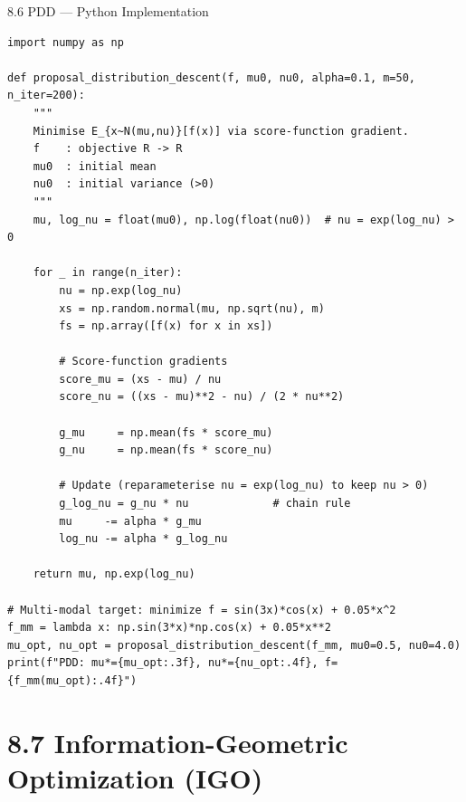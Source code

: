 \documentclass[aspectratio=169,10pt]{beamer}
\begin{document}
\begin{frame}[fragile]{8.6 PDD --- Python Implementation}
\begin{lstlisting}[caption={Proposal distribution descent with Gaussian proposal (Algorithm 8.9)}]
import numpy as np

def proposal_distribution_descent(f, mu0, nu0, alpha=0.1, m=50, n_iter=200):
    """
    Minimise E_{x~N(mu,nu)}[f(x)] via score-function gradient.
    f    : objective R -> R
    mu0  : initial mean
    nu0  : initial variance (>0)
    """
    mu, log_nu = float(mu0), np.log(float(nu0))  # nu = exp(log_nu) > 0

    for _ in range(n_iter):
        nu = np.exp(log_nu)
        xs = np.random.normal(mu, np.sqrt(nu), m)
        fs = np.array([f(x) for x in xs])

        # Score-function gradients
        score_mu = (xs - mu) / nu
        score_nu = ((xs - mu)**2 - nu) / (2 * nu**2)

        g_mu     = np.mean(fs * score_mu)
        g_nu     = np.mean(fs * score_nu)

        # Update (reparameterise nu = exp(log_nu) to keep nu > 0)
        g_log_nu = g_nu * nu             # chain rule
        mu     -= alpha * g_mu
        log_nu -= alpha * g_log_nu

    return mu, np.exp(log_nu)

# Multi-modal target: minimize f = sin(3x)*cos(x) + 0.05*x^2
f_mm = lambda x: np.sin(3*x)*np.cos(x) + 0.05*x**2
mu_opt, nu_opt = proposal_distribution_descent(f_mm, mu0=0.5, nu0=4.0)
print(f"PDD: mu*={mu_opt:.3f}, nu*={nu_opt:.4f}, f={f_mm(mu_opt):.4f}")
\end{lstlisting}
\end{frame}

\section{8.7 Information-Geometric Optimization (IGO)}
\end{document}
